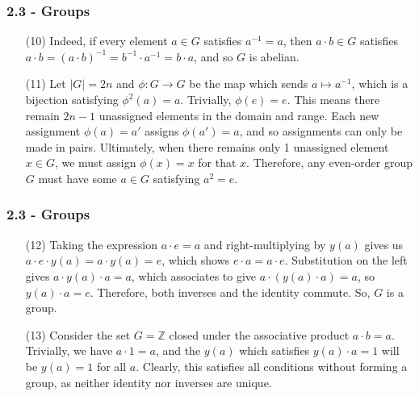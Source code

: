 \documentclass{beamer}
\begin{document}
\begin{frame}
\frametitle{2.3 - Groups}
\small
\begin{enumerate}
	\item[(10)] Indeed, if every element $a\in G$ satisfies $a^{-1} = a$, then $a\cdot b\in G$ satisfies $a\cdot b = (a\cdot b)^{-1} = b^{-1}\cdot a^{-1} = b\cdot a$, and so $G$ is abelian.
	\item[(11)] Let $|G| = 2n$ and $\phi: G\to G$ be the map which sends $a\mapsto a^{-1}$, which is a bijection satisfying $\phi^{2}(a) = a$. Trivially, $\phi(e) = e$. This means there remain $2n - 1$ unassigned elements in the domain and range. Each new assignment $\phi(a) = a'$ assigns $\phi(a') = a$, and so assignments can only be made in pairs. Ultimately, when there remains only 1 unassigned element $x\in G$, we must assign $\phi(x) = x$ for that $x$. Therefore, any even-order group $G$ must have some $a\in G$ satisfying $a^2 = e$.
\end{enumerate}
\end{frame}
\begin{frame}
\frametitle{2.3 - Groups}
\small
\begin{enumerate}
	\item[(12)] Taking the expression $a\cdot e = a$ and right-multiplying by $y(a)$ gives us $a\cdot e\cdot y(a) = a\cdot y(a) = e$, which shows $e\cdot a = a\cdot e$. Substitution on the left gives $a\cdot y(a)\cdot a = a$, which associates to give $a\cdot(y(a)\cdot a) = a$, so $y(a)\cdot a = e$. Therefore, both inverses and the identity commute. So, $G$ is a group.
	\item[(13)] Consider the set $G = \mathbb Z$ closed under the associative product $a\cdot b = a$. Trivially, we have $a\cdot 1 = a$, and the $y(a)$ which satisfies $y(a)\cdot a = 1$ will be $y(a) = 1$ for all $a$. Clearly, this satisfies all conditions without forming a group, as neither identity nor inverses are unique.
\end{enumerate}
\end{frame}
\end{document}
